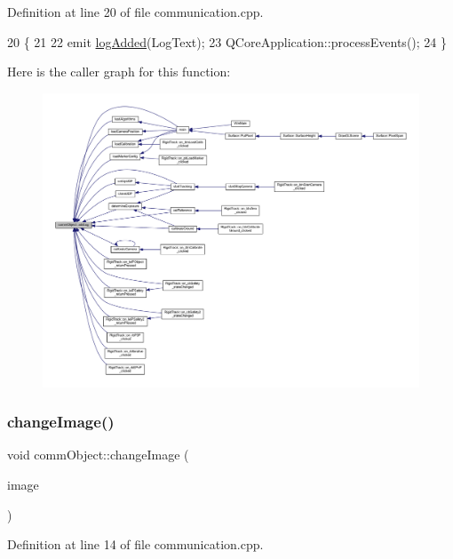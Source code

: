Definition at line 20 of file communication.\+cpp.


\begin{DoxyCode}
20                                        \{
21 
22     emit \hyperlink{classcomm_object_a72620fe1bac16309baf6d148644edaf9}{logAdded}(LogText);
23     QCoreApplication::processEvents();
24 \}
\end{DoxyCode}
Here is the caller graph for this function\+:\nopagebreak
\begin{figure}[H]
\begin{center}
\leavevmode
\includegraphics[width=350pt]{classcomm_object_aec354c7099b3039083cc4224e071e022_icgraph}
\end{center}
\end{figure}
\mbox{\label{classcomm_object_a6f81522c2aa1668fa402f08710e6206b}} 
\subsubsection{\texorpdfstring{change\+Image()}{changeImage()}}
{\footnotesize\ttfamily void comm\+Object\+::change\+Image (\begin{DoxyParamCaption}\item[{Q\+Pixmap}]{image }\end{DoxyParamCaption})}



Definition at line 14 of file communication.\+cpp.


